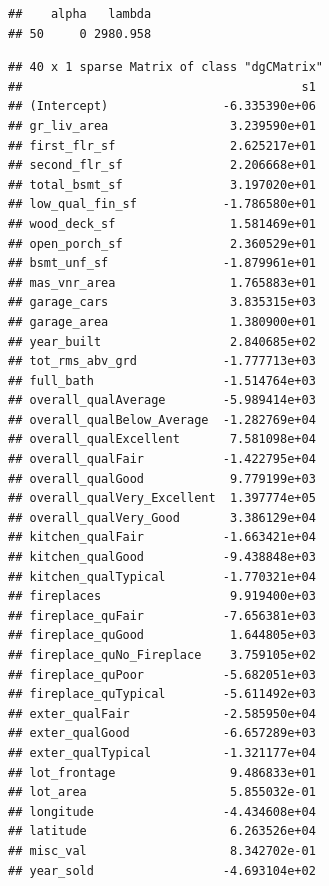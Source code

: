 \documentclass[
]{article}
\newenvironment{Shaded}{\begin{snugshade}}{\end{snugshade}}
\newcommand{\CommentTok}[1]{\textcolor[rgb]{0.56,0.35,0.01}{\textit{#1}}}
\newcommand{\FunctionTok}[1]{\textcolor[rgb]{0.00,0.00,0.00}{#1}}
\newcommand{\NormalTok}[1]{#1}
\newcommand{\SpecialCharTok}[1]{\textcolor[rgb]{0.00,0.00,0.00}{#1}}
\begin{document}
\begin{verbatim}
##    alpha   lambda
## 50     0 2980.958
\end{verbatim}

\begin{Shaded}
\end{Shaded}

\begin{verbatim}
## 40 x 1 sparse Matrix of class "dgCMatrix"
##                                       s1
## (Intercept)                -6.335390e+06
## gr_liv_area                 3.239590e+01
## first_flr_sf                2.625217e+01
## second_flr_sf               2.206668e+01
## total_bsmt_sf               3.197020e+01
## low_qual_fin_sf            -1.786580e+01
## wood_deck_sf                1.581469e+01
## open_porch_sf               2.360529e+01
## bsmt_unf_sf                -1.879961e+01
## mas_vnr_area                1.765883e+01
## garage_cars                 3.835315e+03
## garage_area                 1.380900e+01
## year_built                  2.840685e+02
## tot_rms_abv_grd            -1.777713e+03
## full_bath                  -1.514764e+03
## overall_qualAverage        -5.989414e+03
## overall_qualBelow_Average  -1.282769e+04
## overall_qualExcellent       7.581098e+04
## overall_qualFair           -1.422795e+04
## overall_qualGood            9.779199e+03
## overall_qualVery_Excellent  1.397774e+05
## overall_qualVery_Good       3.386129e+04
## kitchen_qualFair           -1.663421e+04
## kitchen_qualGood           -9.438848e+03
## kitchen_qualTypical        -1.770321e+04
## fireplaces                  9.919400e+03
## fireplace_quFair           -7.656381e+03
## fireplace_quGood            1.644805e+03
## fireplace_quNo_Fireplace    3.759105e+02
## fireplace_quPoor           -5.682051e+03
## fireplace_quTypical        -5.611492e+03
## exter_qualFair             -2.585950e+04
## exter_qualGood             -6.657289e+03
## exter_qualTypical          -1.321177e+04
## lot_frontage                9.486833e+01
## lot_area                    5.855032e-01
## longitude                  -4.434608e+04
## latitude                    6.263526e+04
## misc_val                    8.342702e-01
## year_sold                  -4.693104e+02
\end{verbatim}
\end{document}
